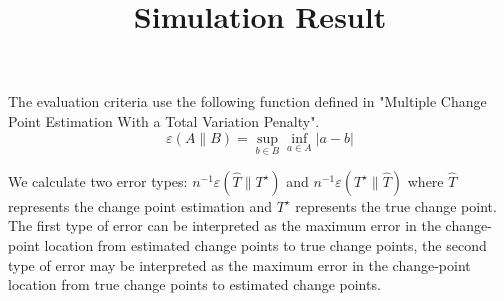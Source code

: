 \documentclass[12pt]{article}
\title{Simulation Result}
\begin{document}
 

The evaluation criteria use the following function defined in "Multiple Change Point Estimation With a Total Variation Penalty".
$$\varepsilon(A\|B)=\underset{b \in B }{\operatorname{sup}} \underset{a \in A }{\operatorname{inf}} |a-b|$$

We calculate  two error types: $n^{-1}\varepsilon(\hat{T}\|T^{\star})$ and $n^{-1}\varepsilon(T^{\star}\|\hat{T})$ where $\hat{T}$ represents the change point estimation and $T^{\star}$ represents the true change point. The first type of error can be interpreted as the maximum error in the change-point location from estimated change points to true change points, the second type of error may be interpreted as the maximum error in the change-point location from true change points to estimated change points.
\end{document}
